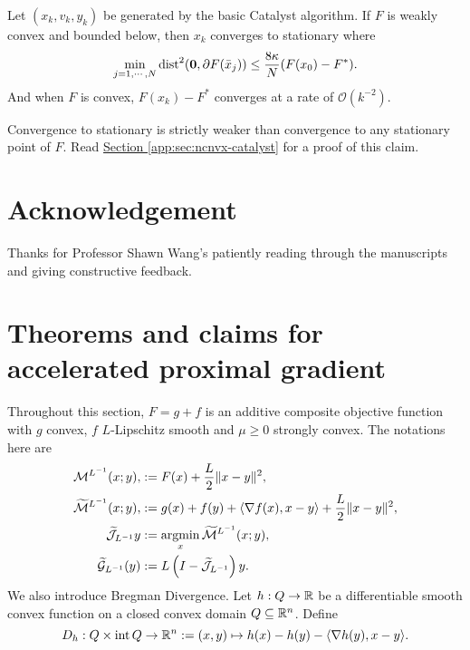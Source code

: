 \documentclass[12pt]{article}
\begin{document}
    \begin{theorem}\label{thm:basic-4wd-catalyst}
        Let $(x_k, v_k, y_k)$ be generated by the basic Catalyst algorithm. 
        If $F$ is weakly convex and bounded below, then $x_k$ converges to stationary where
        \begin{align*}
            \min_{j = 1, \cdots, N} \operatorname{dist}^2(\mathbf 0, \partial F(\bar x_j))
            \le \frac{8 \kappa}{N}(F(x_0) - F^*). 
        \end{align*}
        And when $F$ is convex, $F(x_k) - F^*$ converges at a rate of $\mathcal O(k^{-2})$. 
    \end{theorem}
    \begin{remark}
        Convergence to stationary is strictly weaker than convergence to any stationary point of $F$. 
        Read 
        \hyperref[app:sec:ncnvx-catalyst]{Section \ref*{app:sec:ncnvx-catalyst}} for a proof of this claim. 
    \end{remark}

\section{Acknowledgement}
    Thanks for Professor Shawn Wang's patiently reading through the manuscripts and giving constructive feedback. 



\newpage

\appendix
\section{Theorems and claims for accelerated proximal gradient}\label{app:sec:thm-claim-acc-prox-grad}
    Throughout this section, $F = g + f$ is an additive composite objective function with $g$ convex, $f$ $L$-Lipschitz smooth and $\mu \ge0$ strongly convex. 
    The notations here are 
    \begin{align*}
        \mathcal M^{L^{-1}}(x; y),
        &:= 
        F(x) + \frac{L}{2}\Vert x - y\Vert^2,
        \\
        \widetilde{ \mathcal M}^{L^{-1}}(x; y) ,
        &:= g(x) + f(y) 
        + 
        \left\langle \nabla f(x), x - y\right\rangle 
        + 
        \frac{L}{2}\Vert x - y\Vert^2,
        \\
        \widetilde{\mathcal J}_{L^{-1}}y 
        &:= \mathop{\rm argmin}\limits_{x} \widetilde{\mathcal M}^{L^{-1}}(x; y),
        \\
        \widetilde{\mathcal G}_{L^{-1}}(y)
        &:= L\left(I - \widetilde{\mathcal J}_{L^{-1}}\right)y. 
    \end{align*}
    We also introduce Bregman Divergence. 
    Let $h: Q \rightarrow \mathbb R$ be a differentiable smooth convex function on a closed convex domain $Q \subseteq \mathbb R^n$.
    Define 
    $$
        D_h: Q \times \operatorname{int} Q \rightarrow \mathbb R^n
        := (x, y) \mapsto h(x) - h(y) - \langle \nabla h(y), x - y\rangle. 
    $$
\end{document}
